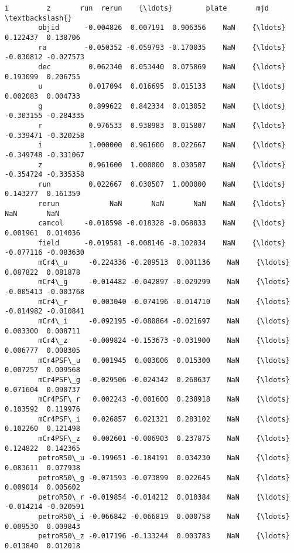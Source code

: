 \documentclass[11pt]{article}
\begin{document}
\begin{Verbatim}[commandchars=\\\{\}]
                           i         z       run  rerun    {\ldots}        plate       mjd  \textbackslash{}
        objid      -0.004826  0.007191  0.906356    NaN    {\ldots}     0.122437  0.138706   
        ra         -0.050352 -0.059793 -0.170035    NaN    {\ldots}    -0.030812 -0.027573   
        dec         0.062340  0.053440  0.075869    NaN    {\ldots}     0.193099  0.206755   
        u           0.017094  0.016695  0.015133    NaN    {\ldots}     0.002083  0.004733   
        g           0.899622  0.842334  0.013052    NaN    {\ldots}    -0.303155 -0.284335   
        r           0.976533  0.938983  0.015807    NaN    {\ldots}    -0.339471 -0.320258   
        i           1.000000  0.961600  0.022667    NaN    {\ldots}    -0.349748 -0.331067   
        z           0.961600  1.000000  0.030507    NaN    {\ldots}    -0.354724 -0.335358   
        run         0.022667  0.030507  1.000000    NaN    {\ldots}     0.143277  0.161359   
        rerun            NaN       NaN       NaN    NaN    {\ldots}          NaN       NaN   
        camcol     -0.018598 -0.018328 -0.068833    NaN    {\ldots}     0.001961  0.014036   
        field      -0.019581 -0.008146 -0.102034    NaN    {\ldots}    -0.077116 -0.083630   
        mCr4\_u     -0.224336 -0.209513  0.001136    NaN    {\ldots}     0.087822  0.081878   
        mCr4\_g     -0.014482 -0.042897 -0.029299    NaN    {\ldots}    -0.005413 -0.003768   
        mCr4\_r      0.003040 -0.074196 -0.014710    NaN    {\ldots}    -0.014982 -0.010841   
        mCr4\_i     -0.092195 -0.080864 -0.021697    NaN    {\ldots}     0.003300  0.008711   
        mCr4\_z     -0.009824 -0.153673 -0.031900    NaN    {\ldots}     0.006777  0.008305   
        mCr4PSF\_u   0.001945  0.003006  0.015300    NaN    {\ldots}     0.007257  0.009568   
        mCr4PSF\_g  -0.029506 -0.024342  0.260637    NaN    {\ldots}     0.071604  0.090737   
        mCr4PSF\_r   0.002243 -0.001600  0.238918    NaN    {\ldots}     0.103592  0.119976   
        mCr4PSF\_i   0.026857  0.021321  0.283102    NaN    {\ldots}     0.102260  0.121498   
        mCr4PSF\_z   0.002601 -0.006903  0.237875    NaN    {\ldots}     0.124822  0.142365   
        petroR50\_u -0.199651 -0.184191  0.034230    NaN    {\ldots}     0.083611  0.077938   
        petroR50\_g -0.071593 -0.073899  0.022645    NaN    {\ldots}     0.009014  0.005602   
        petroR50\_r -0.019854 -0.014212  0.010384    NaN    {\ldots}    -0.014214 -0.020591   
        petroR50\_i -0.066842 -0.066819  0.000758    NaN    {\ldots}     0.009530  0.009843   
        petroR50\_z -0.017196 -0.133244  0.003783    NaN    {\ldots}     0.013840  0.012018   

\end{Verbatim}
\end{document}

